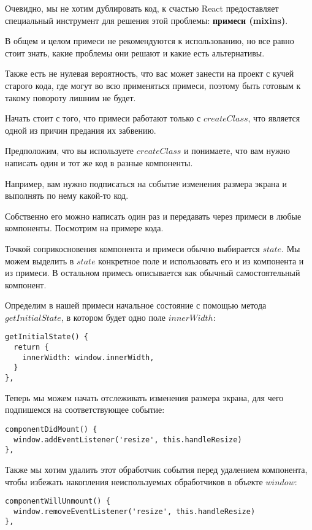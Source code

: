 Очевидно, мы не хотим дублировать код, к счастью React предоставляет специальный инструмент для решения этой проблемы: \textbf{примеси (mixins)}.

В общем и целом примеси не рекомендуются к использованию, но все равно стоит знать, какие проблемы они решают и какие есть альтернативы.

Также есть не нулевая вероятность, что вас может занести на проект с кучей старого кода, где могут во всю применяться примеси, поэтому быть готовым к такому повороту лишним не будет.

Начать стоит с того, что примеси работают только с $createClass$, что является одной из причин предания их забвению.

Предположим, что вы используете $createClass$ и понимаете, что вам нужно написать один и тот же код в разные компоненты.

Например, вам нужно подписаться на событие изменения размера экрана и выполнять по нему какой-то код.

Собственно его можно написать один раз и передавать через примеси в любые компоненты. Посмотрим на примере кода.

Точкой соприкосновения компонента и примеси обычно выбирается $state$. Мы можем выделить в $state$ конкретное поле и использовать его и из компонента и из примеси. В остальном примесь описывается как обычный самостоятельный компонент.

Определим в нашей примеси начальное состояние с помощью метода $getInitialState$, в котором будет одно поле $innerWidth$:

\begin{lstlisting}
getInitialState() {
  return {
    innerWidth: window.innerWidth,
  }
},
\end{lstlisting}

Теперь мы можем начать отслеживать изменения размера экрана, для чего подпишемся на соответствующее событие:

\begin{lstlisting}	
componentDidMount() {
  window.addEventListener('resize', this.handleResize)
},
\end{lstlisting}

Также мы хотим удалить этот обработчик события перед удалением компонента, чтобы избежать накопления неиспользуемых обработчиков в объекте $window$:

\begin{lstlisting}
componentWillUnmount() {
  window.removeEventListener('resize', this.handleResize)
},
\end{lstlisting}


